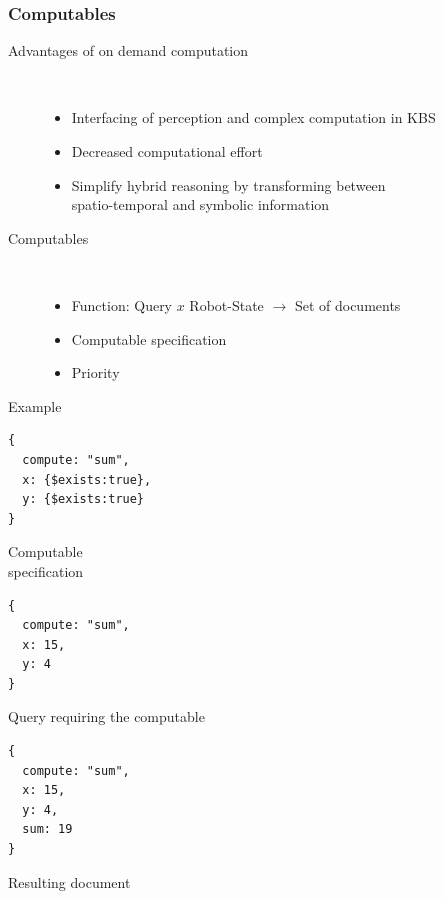\begin{frame}[fragile]
  \frametitle{Computables}
  \begin{description}
  \item[Advantages of on demand computation]%
                \hfill \\
    \begin{itemize}
    \item Interfacing of perception and complex computation in KBS %
    \item Decreased computational effort %
    \item Simplify hybrid reasoning by transforming between\\ spatio-temporal and symbolic information
    \end{itemize}
  \item[Computables]%
                \hfill \\
    \begin{itemize}
    \item Function: Query $x$ Robot-State $\rightarrow$ Set of documents
    \item Computable specification
    \item Priority %
    \end{itemize}
  \item[Example]%
  \end{description}

\begin{minipage}[b]{.27\textwidth}
\begin{lstlisting}[style=ReallySmallJSON,
  framexleftmargin=5pt, xleftmargin=0pt,
 morekeywords={}, numbers=none]
{
  compute: "sum",
  x: {$exists:true},
  y: {$exists:true}
}
\end{lstlisting}
Computable\\specification
\end{minipage}%
\hfill
\begin{minipage}[b]{.25\textwidth}
\begin{lstlisting}[style=ReallySmallJSON,
  framexleftmargin=5pt, xleftmargin=0pt,
 morekeywords={}, numbers=none]
{
  compute: "sum",
  x: 15,
  y: 4
}
\end{lstlisting}
Query requiring the computable
\end{minipage}%
\hfill
\begin{minipage}[b]{.25\textwidth}
\begin{lstlisting}[style=ReallySmallJSON,
  framexleftmargin=5pt, xleftmargin=0pt,
 morekeywords={}, numbers=none]
{
  compute: "sum",
  x: 15,
  y: 4,
  sum: 19
}
\end{lstlisting}
  \vspace{-0.1cm}
Resulting document
\end{minipage}%
\end{frame}

